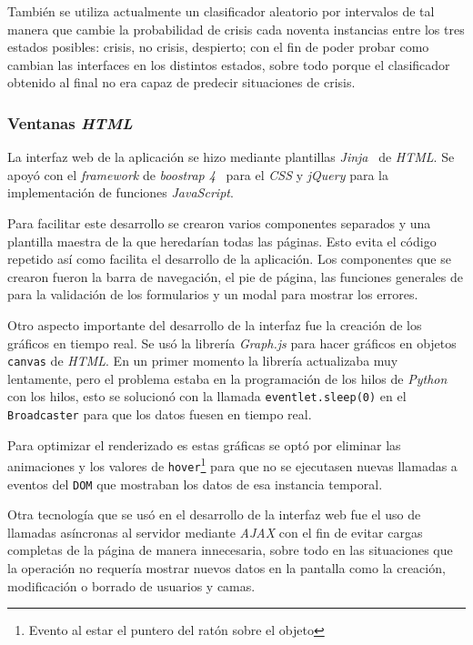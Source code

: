 También se utiliza actualmente un clasificador aleatorio por intervalos de tal manera que cambie la probabilidad de crisis cada noventa instancias entre los tres estados posibles: crisis, no crisis, despierto; con el fin de poder probar como cambian las interfaces en los distintos estados, sobre todo porque el clasificador obtenido al final no era capaz de predecir situaciones de crisis.

\subsubsection{Ventanas \textit{HTML}}

La interfaz web de la aplicación se hizo mediante plantillas \textit{Jinja}~\cite{tool:jinja} de \textit{HTML}. Se apoyó con el \textit{framework} de \textit{boostrap 4}~\cite{wiki:boostrap} para el \textit{CSS} y \textit{jQuery} para la implementación de funciones \textit{JavaScript}.

Para facilitar este desarrollo se crearon varios componentes separados y una plantilla maestra de la que heredarían todas las páginas. Esto evita el código repetido así como facilita el desarrollo de la aplicación. Los componentes que se crearon fueron la barra de navegación, el pie de página, las funciones generales de para la validación de los formularios y un modal para mostrar los errores.

Otro aspecto importante del desarrollo de la interfaz fue la creación de los gráficos en tiempo real. Se usó la librería \textit{Graph.js} para hacer gráficos en objetos \texttt{canvas} de \textit{HTML}. En un primer momento la librería actualizaba muy lentamente, pero el problema estaba en la programación de los hilos de \textit{Python} con los hilos, esto se solucionó con la llamada \texttt{eventlet.sleep(0)} en el \texttt{Broadcaster} para que los datos fuesen en tiempo real.

Para optimizar el renderizado es estas gráficas se optó por eliminar las animaciones y los valores de \texttt{hover}\footnote{Evento al estar el puntero del ratón sobre el objeto} para que no se ejecutasen nuevas llamadas a eventos del \texttt{DOM} que mostraban los datos de esa instancia temporal.

Otra tecnología que se usó en el desarrollo de la interfaz web fue el uso de llamadas asíncronas al servidor mediante \textit{AJAX} con el fin de evitar cargas completas de la página de manera innecesaria, sobre todo en las situaciones que la operación no requería mostrar nuevos datos en la pantalla como la creación, modificación o borrado de usuarios y camas. 

